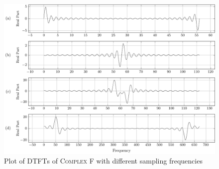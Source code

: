 \documentclass[../../course]{subfiles}
\begin{document}
\begin{figure} [H]
    \centering
     {
        \includegraphics[height = 0.8\textheight] {tikzpics/plotDtftComplexF64.pdf}
    }
     {Plot of \textsc{DTFT}s of \textsc{Complex F} with different sampling frequencies}
    \label{plt:dtftComplexF}
\end{figure}






%
%
%
%
%
%
%
\end{document}
